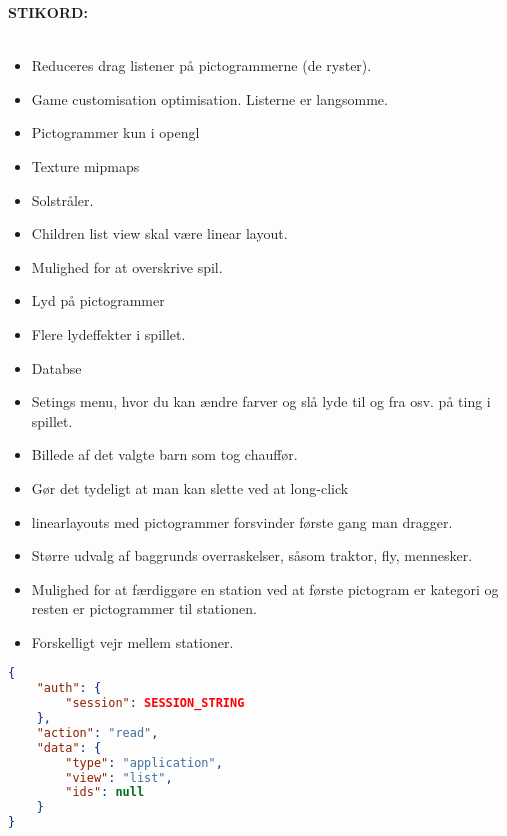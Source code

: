 

\textbf{STIKORD:}\\\\
\begin{itemize}
\item Reduceres drag listener på pictogrammerne (de ryster).
\item Game customisation optimisation. Listerne er langsomme.
\item Pictogrammer kun i opengl
\item Texture mipmaps
\item Solstråler.
\item Children list view skal være linear layout.
\item Mulighed for at overskrive spil.
\item Lyd på pictogrammer
\item Flere lydeffekter i spillet.
\item Databse 
\item Setings menu, hvor du kan ændre farver og slå lyde til og fra osv. på ting i spillet.
\item Billede af det valgte barn som tog chauffør.
\item Gør det tydeligt at man kan slette ved at long-click
\item linearlayouts med pictogrammer forsvinder første gang man dragger.
\item Større udvalg af baggrunds overraskelser, såsom traktor, fly, mennesker.
\item Mulighed for at færdiggøre en station ved at første pictogram er kategori og resten er pictogrammer til stationen.
\item Forskelligt vejr mellem stationer.

\end{itemize}
\begin{lstlisting}[language=json,firstnumber=1,caption={JSON guery to read application data},label=lst:jsonread]
{
	"auth": {
		"session": SESSION_STRING
	},
	"action": "read",
	"data": {
		"type": "application",
		"view": "list",
		"ids": null
	}
}
\end{lstlisting} 
